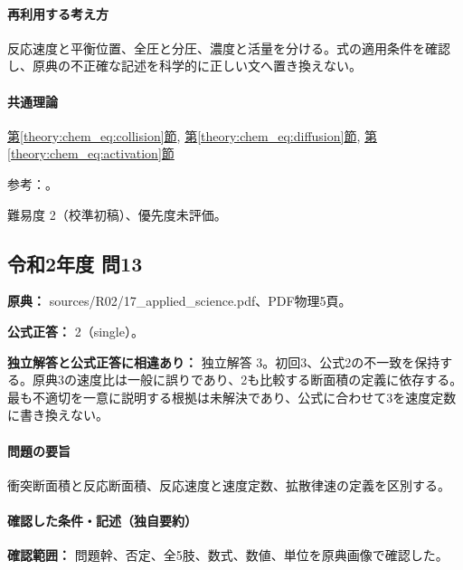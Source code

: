 \paragraph{再利用する考え方} 反応速度と平衡位置、全圧と分圧、濃度と活量を分ける。式の適用条件を確認し、原典の不正確な記述を科学的に正しい文へ置き換えない。

\paragraph{共通理論} \hyperref[theory:chem_eq:collision]{第\ref*{theory:chem_eq:collision}節}, \hyperref[theory:chem_eq:diffusion]{第\ref*{theory:chem_eq:diffusion}節}, \hyperref[theory:chem_eq:activation]{第\ref*{theory:chem_eq:activation}節}

\par 参考：\cite{iupac_greenbook2012}。

\par 難易度 2（校準初稿）、優先度未評価。

\subsection{令和2年度 問13}
\label{q:r02-reg-applied-13}

\noindent\textbf{原典：} sources/R02/17\_applied\_science.pdf、PDF物理5頁。

\textbf{公式正答：} 2（single）。

\par\textbf{独立解答と公式正答に相違あり：} 独立解答 3。初回3、公式2の不一致を保持する。原典3の速度比は一般に誤りであり、2も比較する断面積の定義に依存する。最も不適切を一意に説明する根拠は未解決であり、公式に合わせて3を速度定数に書き換えない。

\paragraph{問題の要旨} 衝突断面積と反応断面積、反応速度と速度定数、拡散律速の定義を区別する。

\paragraph{確認した条件・記述（独自要約）}\mbox{}\par

\noindent\textbf{確認範囲：} 問題幹、否定、全5肢、数式、数値、単位を原典画像で確認した。\par

